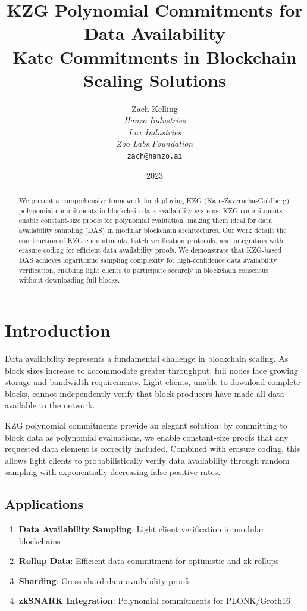 \documentclass[11pt,a4paper]{article}
\title{KZG Polynomial Commitments for Data Availability\\
Kate Commitments in Blockchain Scaling Solutions}
\author{Zach Kelling\\
\textit{Hanzo Industries}\\
\textit{Lux Industries}\\
\textit{Zoo Labs Foundation}\\
\texttt{zach@hanzo.ai}}
\date{2023}
\begin{document}
\maketitle

\begin{abstract}
We present a comprehensive framework for deploying KZG (Kate-Zaverucha-Goldberg) polynomial commitments in blockchain data availability systems. KZG commitments enable constant-size proofs for polynomial evaluation, making them ideal for data availability sampling (DAS) in modular blockchain architectures. Our work details the construction of KZG commitments, batch verification protocols, and integration with erasure coding for efficient data availability proofs. We demonstrate that KZG-based DAS achieves logarithmic sampling complexity for high-confidence data availability verification, enabling light clients to participate securely in blockchain consensus without downloading full blocks.
\end{abstract}

\section{Introduction}

Data availability represents a fundamental challenge in blockchain scaling. As block sizes increase to accommodate greater throughput, full nodes face growing storage and bandwidth requirements. Light clients, unable to download complete blocks, cannot independently verify that block producers have made all data available to the network.

KZG polynomial commitments \cite{kzg} provide an elegant solution: by committing to block data as polynomial evaluations, we enable constant-size proofs that any requested data element is correctly included. Combined with erasure coding, this allows light clients to probabilistically verify data availability through random sampling with exponentially decreasing false-positive rates.

\subsection{Applications}

\begin{enumerate}[label=(\roman*)]
    \item \textbf{Data Availability Sampling}: Light client verification in modular blockchains
    \item \textbf{Rollup Data}: Efficient data commitment for optimistic and zk-rollups
    \item \textbf{Sharding}: Cross-shard data availability proofs
    \item \textbf{zkSNARK Integration}: Polynomial commitments for PLONK/Groth16
\end{enumerate}
\end{document}
